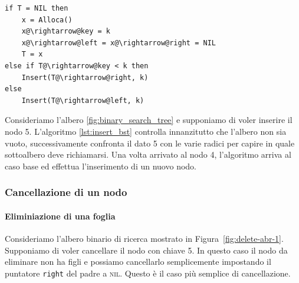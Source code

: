 \begin{lstlisting}[language=asd,caption={Insert(T,k)},label=lst:insert_bst]
if T = NIL then
	x = Alloca()
	x@\rightarrow@key = k
	x@\rightarrow@left = x@\rightarrow@right = NIL
	T = x
else if T@\rightarrow@key < k then
	Insert(T@\rightarrow@right, k)
else
	Insert(T@\rightarrow@left, k)
\end{lstlisting}

\begin{example}
Consideriamo l'albero \ref{fig:binary_search_tree} e supponiamo di voler inserire il nodo 5. L'algoritmo \ref{lst:insert_bst} controlla innanzitutto che l'albero non sia vuoto, successivamente confronta il dato 5 con le varie radici per capire in quale sottoalbero deve richiamarsi. Una volta arrivato al nodo 4, l'algoritmo arriva al caso base ed effettua l'inserimento di un nuovo nodo.
\begin{center}
\end{center}
\end{example}

\subsubsection{Cancellazione di un nodo}\label{sez:abr_delete}
\paragraph{Eliminiazione di una foglia}
Consideriamo l'albero binario di ricerca mostrato in Figura~\ref{fig:delete-abr-1}. Supponiamo di voler cancellare il nodo con chiave 5. In questo caso il nodo da eliminare non ha figli e possiamo cancellarlo semplicemente impostando il puntatore \texttt{right} del padre a \textsc{nil}. Questo è il caso più semplice di \hypertarget{abr:delete}{cancellazione}.

